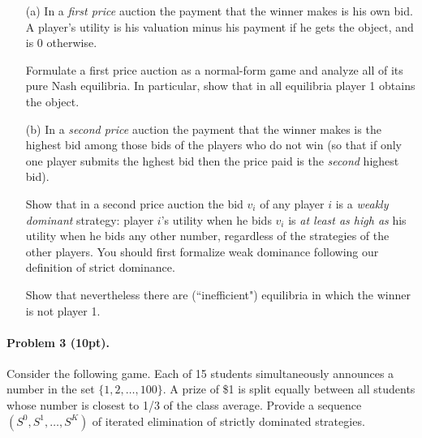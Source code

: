 \documentclass[12pt]{article}
\begin{document}
\begin{itemize}
\item[(a)] In a {\em first price} auction the payment that the winner makes is his own bid. A player's utility is his valuation minus his payment if he gets the object, and is 0 otherwise.

Formulate a first price auction as a normal-form game and analyze all of its pure Nash equilibria. In particular, show that in all equilibria player 1 obtains the object.

\item[(b)] In a {\em second price} auction the payment that the winner makes is the highest bid among those bids of the players who do not win (so that if only one player submits the hghest bid then the price paid is the {\em second} highest bid).

Show that in a second price auction the bid $v_i$ of any player $i$ is a {\em weakly dominant} strategy: player $i$'s utility when he bids $v_i$ is {\em at least as high as} his utility when he bids any other number, regardless of the strategies of the other players. You should first formalize weak dominance following our definition of strict dominance.

Show that nevertheless there are (``inefficient") equilibria in which the winner is not player 1.
\end{itemize}

\paragraph{Problem 3 (10pt).} Consider the following game. Each of 15 students simultaneously announces a number in the set $\{1, 2, \dots, 100\}$. A prize of \$1 is split equally between all students whose number is closest to 1/3 of the class average.
Provide a sequence $(S^0, S^1, \dots, S^K)$ of iterated elimination of strictly dominated strategies.
\end{document}
